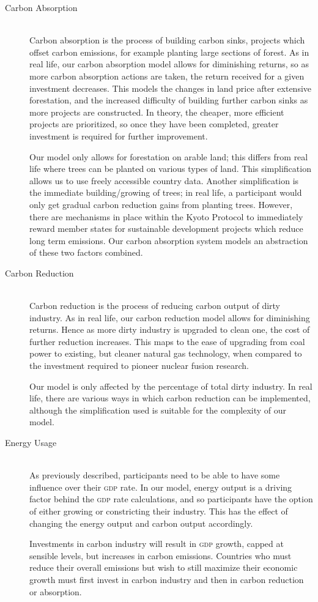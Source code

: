 \begin{description}
\item [Carbon Absorption] \hfill \\ 
Carbon absorption is the process of building carbon sinks, projects which offset carbon emissions, for example planting large sections of forest. As in real life, our carbon absorption model allows for diminishing returns, so as more carbon absorption actions are taken, the return received for a given investment decreases. This models the changes in land price after extensive forestation, and the increased difficulty of building further carbon sinks as more projects are constructed. In theory, the cheaper, more efficient projects are prioritized, so once they have been completed, greater investment is required for further improvement.

Our model only allows for forestation on arable land; this differs from real life where trees can be planted on various types of land. This simplification allows us to use freely accessible country data. Another simplification is the immediate building/growing of trees; in real life, a participant would only get gradual carbon reduction gains from planting trees. However, there are mechanisms in place within the Kyoto Protocol to immediately reward member states for sustainable development projects which reduce long term emissions. Our carbon absorption system models an abstraction of these two factors combined. 

\item [Carbon Reduction] \hfill \\ 
Carbon reduction is the process of reducing carbon output of dirty industry. As in real life, our carbon reduction model allows for diminishing returns. Hence as more dirty industry is upgraded to clean one, the cost of further reduction increases. This maps to the ease of upgrading from coal power to existing, but cleaner natural gas technology, when compared to the investment required to pioneer nuclear fusion research.

Our model is only affected by the percentage of total dirty industry. In real life, there are various ways in which carbon reduction can be implemented, although the simplification used is suitable for the complexity of our model.

\item [Energy Usage] \hfill \\ 
As previously described, participants need to be able to have some influence over their \textsc{gdp} rate. In our model, energy output is a driving factor behind the \textsc{gdp} rate calculations, and so participants have the option of either growing or constricting their industry. This has the effect of changing the energy output and carbon output accordingly.

Investments in carbon industry will result in \textsc{gdp} growth, capped at sensible levels, but increases in carbon emissions. Countries who must reduce their overall emissions but wish to still maximize their economic growth must first invest in carbon industry and then in carbon reduction or absorption.
\end{description}

